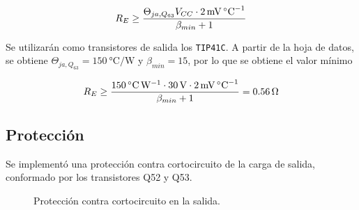 \begin{equation}
	\centering
	R_E \geq \frac{\Theta_{ja,Q_{63}} V_{CC} \cdot \SI{2}{\milli\volt\per\celsius}}{\beta_{min} + 1}
	\label{ec.re}
\end{equation}
	
	Se utilizarán como transistores de salida los \texttt{TIP41C}. A partir de la hoja de datos, se obtiene $\Theta_{ja,Q_{63}} = \SI{150}{\celsius\per\watt}$ y $\beta_{min} = 15$, por lo que se obtiene el valor mínimo

	\begin{equation}
		\centering
		R_E \geq \frac{ \SI{150}{\celsius\per\watt} \cdot \SI{30}{\volt} \cdot \SI{2}{\milli\volt\per\celsius} }{ \beta_{min} + 1 } = \SI{0.56}{\ohm}
	\end{equation}

	\subsection{Protección}
	Se implementó una protección contra cortocircuito de la carga de salida, conformado por los transistores Q52 y Q53.

	\begin{figure}[H]
		\centering
		\scalebox{0.5}{}
		\caption{Protección contra cortocircuito en la salida.}
		\label{fig.proteccion}
	\end{figure}
